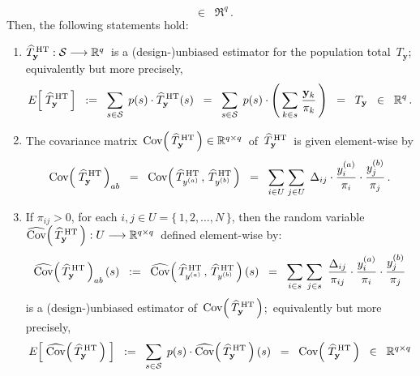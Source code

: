 \begin{proposition}
\begin{equation*}
	\;\; \in \;\;
	\Re^{q}\,.
\end{equation*}
Then, the following statements hold:
\begin{enumerate}
\item
	$\widehat{T}^{\,\textnormal{HT}}_{\mathbf{y}} : \mathcal{S} \longrightarrow \Re^{q}$\,
	is a (design-)unbiased estimator for the population total \,$T_{\mathbf{y}}$;\,
	equivalently but more precisely,
	\begin{equation*}
	E\!\left[\;\widehat{T}^{\,\textnormal{HT}}_{\mathbf{y}}\,\right]
	\;\; := \;\;
		\underset{s \in \mathcal{S}}{\sum}\;\,
		p(s) \cdot \widehat{T}^{\,\textnormal{HT}}_{\mathbf{y}}(s)
	\;\; = \;\;
		\underset{s \in \mathcal{S}}{\sum}\;\,
		p(s) \cdot \left(\,\underset{k \in s}{\sum}\;\dfrac{\mathbf{y}_{k}}{\pi_{k}}\,\right)
	\;\; = \;\;
		T_{\mathbf{y}}
	\;\; \in \;\;
		\Re^{q}\,.
	\end{equation*}
\item
	The covariance matrix
	\,$\Cov\!\left(\,\widehat{T}^{\,\textnormal{HT}}_{\mathbf{y}}\,\right) \in \Re^{q \times q}$\,
	of \,$\widehat{T}^{\,\textnormal{HT}}_{\mathbf{y}}$\, is given element-wise by
	\begin{equation*}
	\Cov\!\left(\;\widehat{T}^{\,\textnormal{HT}}_{\mathbf{y}}\,\right)_{ab}
	\;\; = \;\;
		\Cov\!\left(\,\widehat{T}^{\,\textnormal{HT}}_{y^{(a)}}\,,\,\widehat{T}^{\,\textnormal{HT}}_{y^{(b)}}\,\right)
	\;\; = \;\;
		\underset{i \in U}{\sum} \; \underset{j \in U}{\sum}\;\,
		\Delta_{ij} \cdot \dfrac{y^{(a)}_{i}}{\pi_{i}} \cdot \dfrac{y^{(b)}_{j}}{\pi_{j}}\,.
	\end{equation*}
\item
	If $\pi_{ij} > 0$, for each $i , j \in U = \{\,1,2,\ldots,N\,\}$, then the random variable
	\,$\widehat{\Cov}\!\left(\,\widehat{T}^{\,\textnormal{HT}}_{\mathbf{y}}\,\right) : U \longrightarrow \Re^{q \times q}$\,
	defined element-wise by:
	\begin{equation*}
	\widehat{\Cov}\!\left(\,\widehat{T}^{\,\textnormal{HT}}_{\mathbf{y}}\,\right)_{ab}(s)
	\;\; := \;\;
		\widehat{\Cov}\!\left(\,\widehat{T}^{\,\textnormal{HT}}_{y^{(a)}}\,,\,\widehat{T}^{\,\textnormal{HT}}_{y^{(b)}}\,\right)(s)
	\;\; = \;\;
		\underset{i \in s}{\sum} \; \underset{j \in s}{\sum}\;\,
		\dfrac{\Delta_{ij}}{\pi_{ij}} \cdot \dfrac{y^{(a)}_{i}}{\pi_{i}} \cdot \dfrac{y^{(b)}_{j}}{\pi_{j}}
	\end{equation*}
	is a (design-)unbiased estimator of \,$\Cov\!\left(\,\widehat{T}^{\,\textnormal{HT}}_{\mathbf{y}}\,\right)$;\,
	equivalently but more precisely,
	\begin{equation*}
	E\!\left[\; \widehat{\Cov}\!\left(\,\widehat{T}^{\,\textnormal{HT}}_{\mathbf{y}}\,\right) \;\right]
	\;\; := \;\;
		\underset{s\in\mathcal{S}}{\sum}\;\,
		p(s) \cdot \widehat{\Cov}\!\left(\,\widehat{T}^{\,\textnormal{HT}}_{\mathbf{y}}\,\right)(s)
	\;\; = \;\;
		\Cov\!\left(\;\widehat{T}^{\,\textnormal{HT}}_{\mathbf{y}}\,\right)
	\;\; \in \;\;
		\Re^{q \times q}
	\end{equation*}
\end{enumerate}
\end{proposition}

